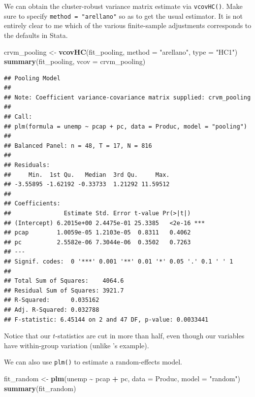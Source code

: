 \documentclass[
  12pt,
  oneside,openany]{book}
\newenvironment{Shaded}{\begin{snugshade}}{\end{snugshade}}
\newcommand{\DataTypeTok}[1]{\textcolor[rgb]{0.13,0.29,0.53}{#1}}
\newcommand{\KeywordTok}[1]{\textcolor[rgb]{0.13,0.29,0.53}{\textbf{#1}}}
\newcommand{\NormalTok}[1]{#1}
\newcommand{\OperatorTok}[1]{\textcolor[rgb]{0.81,0.36,0.00}{\textbf{#1}}}
\newcommand{\StringTok}[1]{\textcolor[rgb]{0.31,0.60,0.02}{#1}}
\begin{document}
We can obtain the cluster-robust variance matrix estimate via \texttt{vcovHC()}. Make sure to specify \texttt{method\ =\ "arellano"} so as to get the usual estimator. It is not entirely clear to me which of the various finite-sample adjustments corresponds to the defaults in Stata.

\begin{Shaded}
\begin{Highlighting}[]
\NormalTok{crvm\_pooling <{-}}\StringTok{ }\KeywordTok{vcovHC}\NormalTok{(fit\_pooling,}
                       \DataTypeTok{method =} \StringTok{"arellano"}\NormalTok{,}
                       \DataTypeTok{type =} \StringTok{"HC1"}\NormalTok{)}
\KeywordTok{summary}\NormalTok{(fit\_pooling, }\DataTypeTok{vcov =}\NormalTok{ crvm\_pooling)}
\end{Highlighting}
\end{Shaded}

\begin{verbatim}
## Pooling Model
## 
## Note: Coefficient variance-covariance matrix supplied: crvm_pooling
## 
## Call:
## plm(formula = unemp ~ pcap + pc, data = Produc, model = "pooling")
## 
## Balanced Panel: n = 48, T = 17, N = 816
## 
## Residuals:
##     Min.  1st Qu.   Median  3rd Qu.     Max. 
## -3.55895 -1.62192 -0.33733  1.21292 11.59512 
## 
## Coefficients:
##               Estimate Std. Error t-value Pr(>|t|)    
## (Intercept) 6.2015e+00 2.4475e-01 25.3385   <2e-16 ***
## pcap        1.0059e-05 1.2103e-05  0.8311   0.4062    
## pc          2.5582e-06 7.3044e-06  0.3502   0.7263    
## ---
## Signif. codes:  0 '***' 0.001 '**' 0.01 '*' 0.05 '.' 0.1 ' ' 1
## 
## Total Sum of Squares:    4064.6
## Residual Sum of Squares: 3921.7
## R-Squared:      0.035162
## Adj. R-Squared: 0.032788
## F-statistic: 6.45144 on 2 and 47 DF, p-value: 0.0033441
\end{verbatim}

Notice that our \(t\)-statistics are cut in more than half, even though our variables have within-group variation (unlike \citet{Moulton:1990bl}'s example).

We can also use \texttt{plm()} to estimate a random-effects model.

\begin{Shaded}
\begin{Highlighting}[]
\NormalTok{fit\_random <{-}}\StringTok{ }\KeywordTok{plm}\NormalTok{(unemp }\OperatorTok{\textasciitilde{}}\StringTok{ }\NormalTok{pcap }\OperatorTok{+}\StringTok{ }\NormalTok{pc,}
                  \DataTypeTok{data =}\NormalTok{ Produc,}
                  \DataTypeTok{model =} \StringTok{"random"}\NormalTok{)}
\KeywordTok{summary}\NormalTok{(fit\_random)}
\end{Highlighting}
\end{Shaded}
\end{document}
